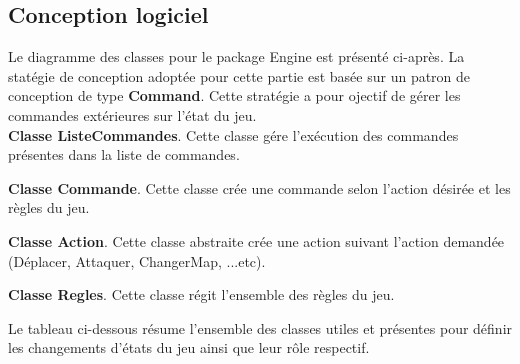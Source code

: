 \documentclass[11pt, a4paper]{article}
\begin{document}
\subsection{Conception logiciel}

Le diagramme des classes pour le package Engine est présenté ci-après.
La statégie de conception adoptée pour cette partie est basée sur un patron de conception de type \textbf{Command}. Cette stratégie a pour ojectif de gérer les commandes extérieures sur l'état du jeu.\\


\textbf{Classe ListeCommandes}. Cette classe gére l'exécution des commandes présentes dans la liste de commandes.

\textbf{Classe Commande}. Cette classe crée une commande selon l'action désirée et les règles du jeu.

\textbf{Classe Action}. Cette classe abstraite crée une action suivant l'action demandée (Déplacer, Attaquer, ChangerMap, ...etc).

\textbf{Classe Regles}. Cette classe régit l'ensemble des règles du jeu.

Le tableau ci-dessous résume l'ensemble des classes utiles et présentes pour définir les changements d'états du jeu ainsi que leur rôle respectif.
\end{document}
